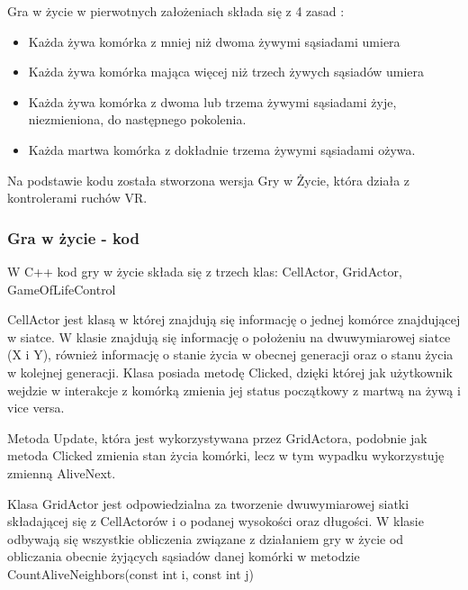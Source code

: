 \documentclass[a4paper,12pt,reqno]{article}
\begin{document}
Gra w życie w pierwotnych założeniach składa się z 4 zasad \cite{game_of_life_story}:

\begin{itemize}
\item Każda żywa komórka z mniej niż dwoma żywymi sąsiadami umiera
\item Każda żywa komórka mająca więcej niż trzech żywych sąsiadów umiera
\item Każda żywa komórka z dwoma lub trzema żywymi sąsiadami żyje, niezmieniona, do następnego pokolenia.
\item Każda martwa komórka z dokładnie trzema żywymi sąsiadami ożywa.
\end{itemize}


Na podstawie kodu \cite{game_of_life_code} została stworzona wersja Gry w Życie, która działa z kontrolerami ruchów VR.
\subsubsection{Gra w życie - kod}

W C++ kod gry w życie składa się z trzech klas: CellActor, GridActor, GameOfLifeControl

CellActor jest klasą w której znajdują się informację o jednej komórce znajdującej w siatce. W klasie znajdują się informację o położeniu na dwuwymiarowej siatce (X i Y), również informację o stanie życia w obecnej generacji oraz o stanu życia w kolejnej generacji. Klasa posiada metodę Clicked, dzięki której jak użytkownik wejdzie w interakcje z komórką zmienia jej status początkowy z martwą na żywą i vice versa. 



Metoda Update, która jest wykorzystywana przez GridActora, podobnie jak metoda Clicked zmienia stan życia komórki, lecz w tym wypadku wykorzystuję zmienną AliveNext.




Klasa GridActor jest odpowiedzialna za tworzenie dwuwymiarowej siatki składającej się z CellActorów i o podanej wysokości oraz długości. W klasie odbywają się wszystkie obliczenia związane z działaniem gry w życie od obliczania obecnie żyjących sąsiadów danej komórki w metodzie CountAliveNeighbors(const int i, const int j)
\end{document}
